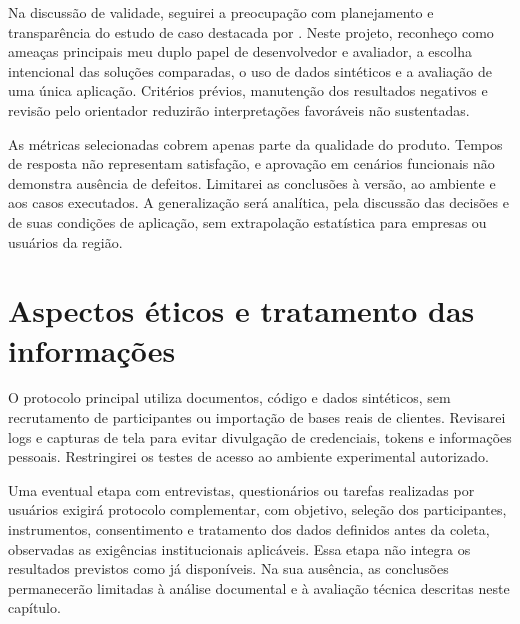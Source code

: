 Na discussão de validade, seguirei a preocupação com planejamento e transparência do estudo de caso destacada por . Neste projeto, reconheço como ameaças principais meu duplo papel de desenvolvedor e avaliador, a escolha intencional das soluções comparadas, o uso de dados sintéticos e a avaliação de uma única aplicação. Critérios prévios, manutenção dos resultados negativos e revisão pelo orientador reduzirão interpretações favoráveis não sustentadas.

As métricas selecionadas cobrem apenas parte da qualidade do produto. Tempos de resposta não representam satisfação, e aprovação em cenários funcionais não demonstra ausência de defeitos. Limitarei as conclusões à versão, ao ambiente e aos casos executados. A generalização será analítica, pela discussão das decisões e de suas condições de aplicação, sem extrapolação estatística para empresas ou usuários da região.

\section{Aspectos éticos e tratamento das informações}

O protocolo principal utiliza documentos, código e dados sintéticos, sem recrutamento de participantes ou importação de bases reais de clientes. Revisarei logs e capturas de tela para evitar divulgação de credenciais, tokens e informações pessoais. Restringirei os testes de acesso ao ambiente experimental autorizado.

Uma eventual etapa com entrevistas, questionários ou tarefas realizadas por usuários exigirá protocolo complementar, com objetivo, seleção dos participantes, instrumentos, consentimento e tratamento dos dados definidos antes da coleta, observadas as exigências institucionais aplicáveis. Essa etapa não integra os resultados previstos como já disponíveis. Na sua ausência, as conclusões permanecerão limitadas à análise documental e à avaliação técnica descritas neste capítulo.
